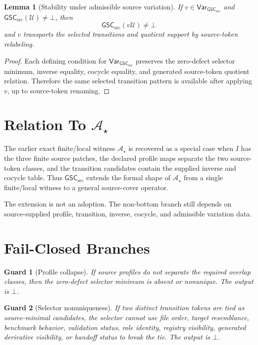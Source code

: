 \documentclass[11pt]{article}
\newcommand{\GSC}{\mathsf{GSC}_{\mathrm{src}}}
\newcommand{\Astar}{\mathcal A_{\star}}
\newcommand{\Vargsc}{\mathsf{Var}_{\GSC}}
\newcommand{\Bot}{\bot}
\newtheorem{lemma}{Lemma}
\newtheorem{guard}{Guard}
\begin{document}
\begin{lemma}[Stability under admissible source variation]
If \(v\in\Vargsc\) and \(\GSC(\mathcal U)\neq\Bot\), then
\[
  \GSC(v\mathcal U)\neq\Bot
\]
and \(v\) transports the selected transitions and quotient support by
source-token relabeling.
\end{lemma}

\begin{proof}
Each defining condition for \(\Vargsc\) preserves the zero-defect selector
minimum, inverse equality, cocycle equality, and generated source-token
quotient relation. Therefore the same selected transition pattern is
available after applying \(v\), up to source-token renaming.
\end{proof}

\section{Relation To \(\Astar\)}

The earlier exact finite/local witness \(\Astar\) is recovered as a special
case when \(I\) has the three finite source patches, the declared profile maps
separate the two source-token classes, and the transition candidates contain
the supplied inverse and cocycle table. Thus \(\GSC\) extends the formal shape
of \(\Astar\) from a single finite/local witness to a general source-cover
operator.

The extension is not an adoption. The non-bottom branch still depends on
source-supplied profile, transition, inverse, cocycle, and admissible
variation data.

\section{Fail-Closed Branches}

\begin{guard}[Profile collapse]
If source profiles do not separate the required overlap classes, then the
zero-defect selector minimum is absent or nonunique. The output is \(\Bot\).
\end{guard}

\begin{guard}[Selector nonuniqueness]
If two distinct transition tokens are tied as source-minimal candidates, the
selector cannot use file order, target resemblance, benchmark behavior,
validation status, role identity, registry visibility, generated derivative
visibility, or handoff status to break the tie. The output is \(\Bot\).
\end{guard}
\end{document}
